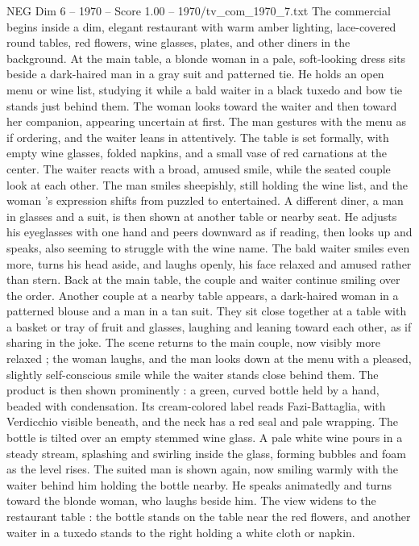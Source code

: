 \begin{textsample}{NEG Dim 6 – 1970 – Score 1.00 – 1970/tv\_com\_1970\_7.txt}  \label{ex:f6_neg_059}
The commercial begins inside a dim, elegant restaurant with warm amber lighting, lace-covered round tables, red flowers, wine glasses, plates, and other diners in the background.
At the main table, a blonde woman in a pale, soft-looking dress sits beside a dark-haired man in a gray suit and patterned tie.
He holds an open menu or wine list, studying it while a bald waiter in a black tuxedo and bow tie stands just behind them.
The woman looks toward the waiter and then toward her companion, appearing uncertain at first.
The man gestures with the menu as if ordering, and the waiter leans in attentively.
The table is set formally, with empty wine glasses, folded napkins, and a small vase of red carnations at the center.
The waiter reacts with a broad, amused smile, while the seated couple look at each other.
The man smiles sheepishly, still holding the wine list, and the woman ’s expression shifts from puzzled to entertained.
A different diner, a man in glasses and a suit, is then shown at another table or nearby seat.
He adjusts his eyeglasses with one hand and peers downward as if reading, then looks up and speaks, also seeming to struggle with the wine name.
The bald waiter smiles even more, turns his head aside, and laughs openly, his face relaxed and amused rather than stern.
Back at the main table, the couple and waiter continue smiling over the order.
Another couple at a nearby table appears, a dark-haired woman in a patterned blouse and a man in a tan suit.
They sit close together at a table with a basket or tray of fruit and glasses, laughing and leaning toward each other, as if sharing in the joke.
The scene returns to the main couple, now visibly more relaxed ; the woman laughs, and the man looks down at the menu with a pleased, slightly self-conscious smile while the waiter stands close behind them.
The product is then shown prominently : a green, curved bottle held by a hand, beaded with condensation.
Its cream-colored label reads Fazi-Battaglia, with Verdicchio visible beneath, and the neck has a red seal and pale wrapping.
The bottle is tilted over an empty stemmed wine glass.
A pale white wine pours in a steady stream, splashing and swirling inside the glass, forming bubbles and foam as the level rises.
The suited man is shown again, now smiling warmly with the waiter behind him holding the bottle nearby.
He speaks animatedly and turns toward the blonde woman, who laughs beside him.
The view widens to the restaurant table : the bottle stands on the table near the red flowers, and another waiter in a tuxedo stands to the right holding a white cloth or napkin.

\end{textsample}

